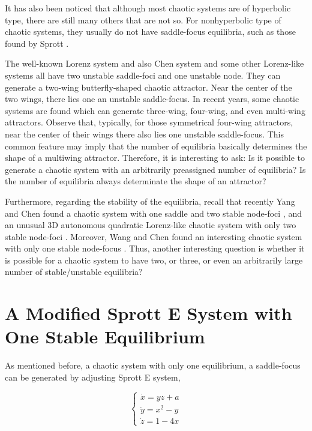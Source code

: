 It has also been noticed that although most chaotic systems are of hyperbolic type, there are still many
others that are not so. For nonhyperbolic type of chaotic systems, they usually do not have saddle-focus
equilibria, such as those found by Sprott \cite{Sprott1993Automatic,Sprott1994Some,Sprott1997Simplest,Sprott2000Algebraically}.

The well-known Lorenz system \cite{Lorenz1962Deterministic} and also Chen system \cite{AttractorYET,TETSUSHI2012BIFURCATION} and some other
Lorenz-like systems \cite{Zhou2005Š,Li2007Hopf,Li2011Dynamical,Mu2011On} all have two unstable saddle-foci and
one unstable node. They can generate a two-wing butterfly-shaped chaotic attractor. Near the center of the two wings, there lies one an unstable saddle-focus.
In recent years, some chaotic systems are found which can generate three-wing, four-wing, and even multi-wing attractors. Observe that, typically, for those
symmetrical four-wing attractors, near the center of their wings there also lies one unstable saddle-focus. This common feature may imply that the number of
equilibria basically determines the shape of a multiwing attractor. Therefore, it is interesting to ask: Is it possible to generate a chaotic system with an
arbitrarily preassigned number of equilibria? Is the number of equilibria always determinate the shape of an attractor?

Furthermore, regarding the stability of the equilibria, recall that recently Yang and Chen found a
chaotic system with one saddle and two stable node-foci \cite{QIGUI2008A}, and an unusual 3D autonomous quadratic
Lorenz-like chaotic system with only two stable node-foci \cite{QIGUI2010AN}. Moreover, Wang and Chen found
an interesting chaotic system with only one stable node-focus \cite{Wang2011A}. Thus, another interesting question is
whether it is possible for a chaotic system to have two, or three, or even an arbitrarily large number of stable/unstable equilibria?

\section*{A Modified Sprott E System with One Stable Equilibrium}
\label{sec:org4cbc203}
As mentioned before, a chaotic system with only one equilibrium, a saddle-focus can be generated by adjusting
Sprott E system,

\begin{equation}
\label{eq:any_equi_01}
\left\{
    \begin{array}{l}
      \dot{x} = yz + a \\
      \dot{y} = x^2-y \\
      \dot{z} = 1-4x
    \end{array}
  \right.
\end{equation}

